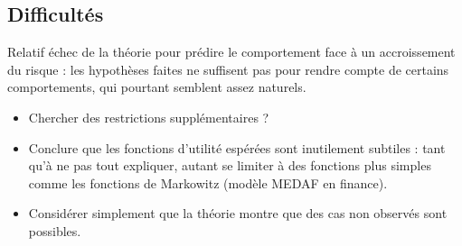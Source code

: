 \documentclass[a4paper, 12pt]{report}
\begin{document}
\subsection{Difficultés}


Relatif échec de la théorie pour prédire le comportement face à un accroissement du risque : les hypothèses faites ne suffisent pas pour rendre compte de certains comportements, qui pourtant semblent assez naturels. 

\begin{itemize}
	\item Chercher des restrictions supplémentaires ?
	\item Conclure que les fonctions d'utilité espérées sont inutilement subtiles : tant qu'à ne pas tout expliquer, autant se limiter à des fonctions plus simples comme les fonctions de Markowitz (modèle MEDAF en finance).
	\item Considérer simplement que la théorie montre que des cas non observés sont possibles.
\end{itemize}
\end{document}
